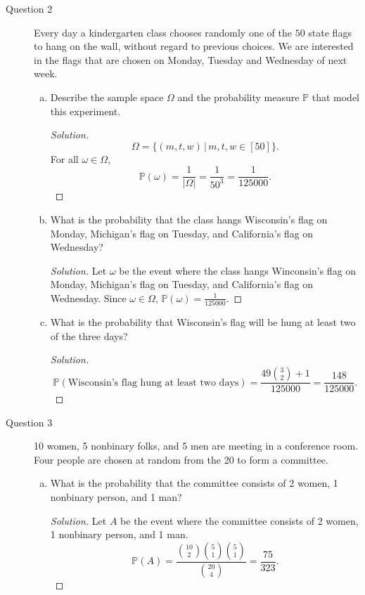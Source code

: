 \documentclass[addpoints, 11pt]{exam}
\newcommand*{\prob}{\mathds{P}}
\begin{document}
\begin{description}
    \newpage

    \item[Question 2]  Every day a kindergarten class chooses randomly one of the $50$ state flags to hang on the wall, without regard to previous choices. We are interested in the flags that are chosen on Monday, Tuesday and Wednesday of next week.

    \begin{enumerate}[(a)]
        \item Describe the sample space $\Omega$ and the probability measure $\prob$ that model this experiment.
        \begin{proof}[Solution] 
            \[
                \Omega = \{(m, t, w) \, | \, m, t, w \in [50] \}.
            \]
            For all $\omega \in \Omega$, 
            \[
                \prob(\omega) = \frac{1}{|\Omega|} = \frac{1}{50^3} = \frac{1}{125000}.
            \]
        \end{proof}

        \item What is the probability that the class hangs Wisconsin’s flag on Monday, Michigan’s flag on Tuesday, and California’s flag on Wednesday?
        \begin{proof}[Solution]
            Let $\omega$ be the event where the class hangs Winconsin's flag on Monday, Michigan's flag on Tuesday, and California's flag on Wednesday. Since $\omega \in \Omega$, $\prob(\omega) = \frac{1}{125000}$.
        \end{proof}

        \item What is the probability that Wisconsin’s flag will be hung at least two of the three days?
        \begin{proof}[Solution]
           \[
            \prob(\text{Wisconsin’s flag hung at least two days}) = \frac{49{3 \choose 2} + 1}{125000} = \frac{148}{125000}.
           \]
        \end{proof}
    \end{enumerate}

    \newpage

    \item[Question 3] 10 women, 5 nonbinary folks, and 5 men are meeting in a conference room. Four people are chosen at random from the 20 to form a committee.

    \begin{enumerate}[(a)]
        \item What is the probability that the committee consists of 2 women, 1 nonbinary person, and 1 man?
        \begin{proof}[Solution] 
            Let $A$ be the event where the committee consists of 2 women, 1 nonbinary person, and 1 man.
            \[
                \prob(A) = \frac{{10 \choose 2}{5 \choose 1}{5 \choose 1}}{{20 \choose 4}} = \frac{75}{323}.
            \]
        \end{proof}


\end{enumerate}
\end{description}
\end{document}
